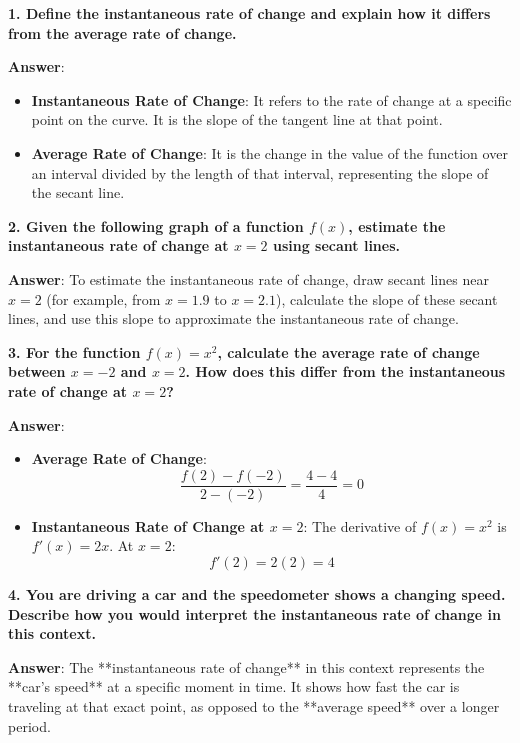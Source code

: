 \documentclass{article}
\begin{document}
\textbf{1. Define the instantaneous rate of change and explain how it differs from the average rate of change.}

\textbf{Answer}: 
\begin{itemize}
    \item \textbf{Instantaneous Rate of Change}: It refers to the rate of change at a specific point on the curve. It is the slope of the tangent line at that point.
    \item \textbf{Average Rate of Change}: It is the change in the value of the function over an interval divided by the length of that interval, representing the slope of the secant line.
\end{itemize}

\bigskip

\textbf{2. Given the following graph of a function \( f(x) \), estimate the instantaneous rate of change at \( x = 2 \) using secant lines.}

\textbf{Answer}: To estimate the instantaneous rate of change, draw secant lines near \( x = 2 \) (for example, from \( x = 1.9 \) to \( x = 2.1 \)), calculate the slope of these secant lines, and use this slope to approximate the instantaneous rate of change.

\bigskip

\textbf{3. For the function \( f(x) = x^2 \), calculate the average rate of change between \( x = -2 \) and \( x = 2 \). How does this differ from the instantaneous rate of change at \( x = 2 \)?}

\textbf{Answer}: 
\begin{itemize}
    \item \textbf{Average Rate of Change}: 
    \[
    \frac{f(2) - f(-2)}{2 - (-2)} = \frac{4 - 4}{4} = 0
    \]
    \item \textbf{Instantaneous Rate of Change at \( x = 2 \)}: The derivative of \( f(x) = x^2 \) is \( f'(x) = 2x \). At \( x = 2 \):
    \[
    f'(2) = 2(2) = 4
    \]
\end{itemize}

\bigskip

\textbf{4. You are driving a car and the speedometer shows a changing speed. Describe how you would interpret the instantaneous rate of change in this context.}

\textbf{Answer}: The **instantaneous rate of change** in this context represents the **car's speed** at a specific moment in time. It shows how fast the car is traveling at that exact point, as opposed to the **average speed** over a longer period.
\end{document}
